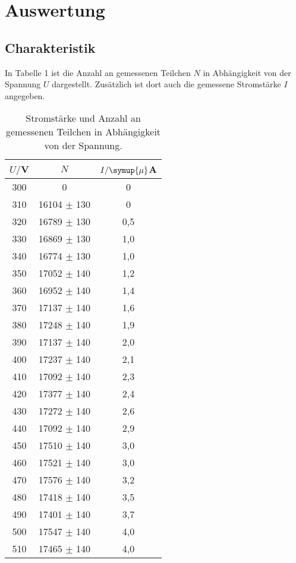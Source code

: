 \section{Auswertung}
\label{sec:Auswertung}

\subsection{Charakteristik}
In Tabelle 1 ist die Anzahl an gemessenen Teilchen $N$ in Abhängigkeit von der Spannung  $U$ dargestellt. Zusätzlich
ist dort auch die gemessene Stromstärke $I$ angegeben.

\begin{table}[H]
  \centering
  \caption{Stromstärke und Anzahl an gemessenen Teilchen in Abhängigkeit von der Spannung.}
  \label{tab:Rechteckspannung}
  \begin{tabular}{c c c}
    \toprule
    $U/$V & $N$ & $I/\symup{\mu}$A \\
    \midrule
    300 &	0	    & 0  \\
    310 &	16104 $\pm$ 130 &	0  \\
    320 &	16789 $\pm$ 130 &	0,5 \\
    330 &	16869 $\pm$ 130 &	1,0 \\
    340 &	16774 $\pm$ 130 &	1,0 \\
    350 &	17052 $\pm$ 140 &	1,2 \\
    360 &	16952 $\pm$ 140 &	1,4 \\
    370 &	17137 $\pm$ 140 &	1,6 \\
    380 &	17248 $\pm$ 140 &	1,9 \\
    390 &	17137 $\pm$ 140 &	2,0 \\
    400 &	17237 $\pm$ 140 &	2,1 \\
    410 &	17092 $\pm$ 140 &	2,3 \\
    420 &	17377 $\pm$ 140 &	2,4 \\
    430 &	17272 $\pm$ 140 &	2,6 \\
    440 &	17092 $\pm$ 140 &	2,9 \\
    450 &	17510 $\pm$ 140 &	3,0 \\
    460 &	17521 $\pm$ 140 &	3,0 \\
    470 &	17576 $\pm$ 140 &	3,2 \\
    480 &	17418 $\pm$ 140 &	3,5 \\
    490 &	17401 $\pm$ 140 &	3,7 \\
    500 &	17547 $\pm$ 140 &	4,0 \\
    510 &	17465 $\pm$ 140 &	4,0 \\

\end{tabular}
\end{table}
